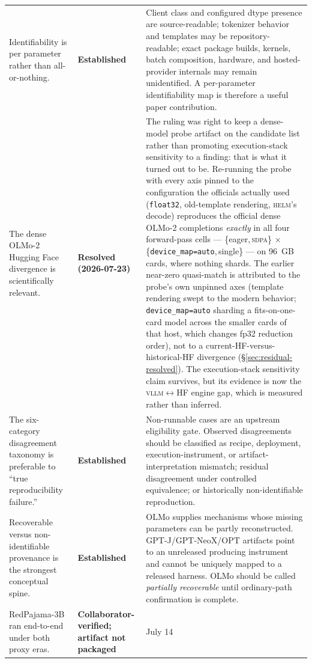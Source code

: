 \documentclass[11pt]{report}
\newcommand{\code}[1]{\texttt{#1}}
\newcommand{\statusEstablished}{\textbf{Established}}
\newcommand{\statusCollaboratorVerified}{\textbf{Collaborator-verified; artifact not packaged}}
\newcommand{\statusResolved}{\textbf{Resolved (2026-07-23)}}
\begin{document}
\begin{longtable}{@{}p{}p{}p{}@{}}
Identifiability is per parameter rather than all-or-nothing. & \statusEstablished &
Client class and configured dtype presence are source-readable; tokenizer behavior
and templates may be repository-readable; exact package builds, kernels, batch
composition, hardware, and hosted-provider internals may remain unidentified. A
per-parameter identifiability map is therefore a useful paper contribution. \\
The dense OLMo-2 Hugging Face divergence is scientifically relevant. &
\statusResolved & The ruling was right to keep a dense-model probe artifact on the
candidate list rather than promoting execution-stack sensitivity to a finding: that
is what it turned out to be. Re-running the probe with every axis pinned to the
configuration the officials actually used (\code{float32}, old-template rendering,
\textsc{helm}'s decode) reproduces the official dense OLMo-2 completions
\emph{exactly} in all four forward-pass cells --- \{eager,\,\textsc{sdpa}\} $\times$
\{\code{device\_map=auto},\,single\} --- on 96~GB cards, where nothing shards. The
earlier near-zero quasi-match is attributed to the probe's own unpinned axes
(template rendering swept to the modern behavior; \code{device\_map=auto} sharding a
fits-on-one-card model across the smaller cards of that host, which changes fp32
reduction order), not to a current-HF-versus-historical-HF divergence
(\S\ref{sec:residual-resolved}). The execution-stack sensitivity claim survives, but
its evidence is now the \textsc{vllm}$\leftrightarrow$HF engine gap, which is
measured rather than inferred. \\
The six-category disagreement taxonomy is preferable to ``true reproducibility
failure.'' & \statusEstablished & Non-runnable cases are an upstream eligibility
gate. Observed disagreements should be classified as recipe, deployment,
execution-instrument, or artifact-interpretation mismatch; residual disagreement
under controlled equivalence; or historically non-identifiable reproduction. \\
Recoverable versus non-identifiable provenance is the strongest conceptual spine. &
\statusEstablished & OLMo supplies mechanisms whose missing parameters can be
partly reconstructed. GPT-J/GPT-NeoX/OPT artifacts point to an unreleased producing
instrument and cannot be uniquely mapped to a released harness. OLMo should be
called \emph{partially recoverable} until ordinary-path confirmation is complete. \\
RedPajama-3B ran end-to-end under both proxy eras. & \statusCollaboratorVerified & July 14

\end{longtable}
\end{document}
